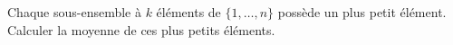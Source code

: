 Chaque sous-ensemble à $k$ éléments de $\{1, \dots, n\}$ possède un plus petit élément. Calculer la moyenne de ces plus petits éléments.